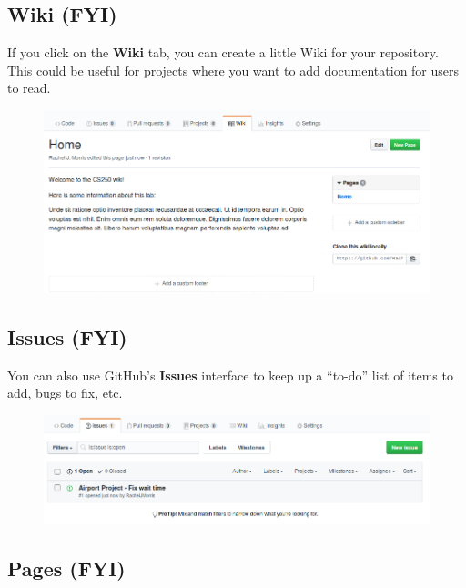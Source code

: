 \documentclass[a4paper,12pt,oneside]{book}
\begin{document}
    \newpage

    \subsection{Wiki (FYI)}

        If you click on the \textbf{Wiki} tab, you can create a little
        Wiki for your repository. This could be useful for projects
        where you want to add documentation for users to read.

        \begin{figure}[h]
            \centering
            \includegraphics[width=14cm]{images/github-wiki.png}
        \end{figure}

    \newpage

    \subsection{Issues (FYI)}

        You can also use GitHub's \textbf{Issues} interface to keep
        up a ``to-do'' list of items to add, bugs to fix, etc.

        \begin{figure}[h]
            \centering
            \includegraphics[width=14cm]{images/github-issues.png}
        \end{figure}

    \newpage

    \subsection{Pages (FYI)}
\end{document}

